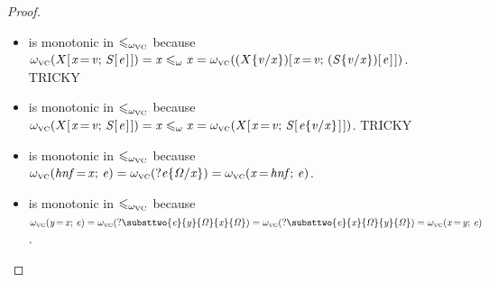 \begin{proof}
\begin{itemize}
\item {} is monotonic in $\leqomegavc$ \hfill\break
because $\omegavc(\ensuremath{X [\mskip1.5mu \Varid{x}\hspace{-0.14em}=\hspace{-0.14em}\Varid{v};\,\Conid{S} [\mskip1.5mu \Varid{e}\mskip1.5mu]\mskip1.5mu]}) = \ensuremath{\Varid{x}} \leqomega \ensuremath{\Varid{x}} = \omegavc(\ensuremath{(\subst{X}{\Varid{x}}{\Varid{v}}) [\mskip1.5mu \Varid{x}\hspace{-0.14em}=\hspace{-0.14em}\Varid{v};\,(\subst{\Conid{S}}{\Varid{x}}{\Varid{v}}) [\mskip1.5mu \Varid{e}\mskip1.5mu]\mskip1.5mu]})$. {\color{red} TRICKY}

\item {} is monotonic in $\leqomegavc$ \hfill\break
because $\omegavc(\ensuremath{X [\mskip1.5mu \Varid{x}\hspace{-0.14em}=\hspace{-0.14em}\Varid{v};\,\Conid{S} [\mskip1.5mu \Varid{e}\mskip1.5mu]\mskip1.5mu]}) = \ensuremath{\Varid{x}} \leqomega \ensuremath{\Varid{x}} = \omegavc(\ensuremath{X [\mskip1.5mu \Varid{x}\hspace{-0.14em}=\hspace{-0.14em}\Varid{v};\,\Conid{S} [\mskip1.5mu \subst{\Varid{e}}{\Varid{x}}{\Varid{v}}\mskip1.5mu]\mskip1.5mu]})$. {\color{red} TRICKY}

\item {} is monotonic in $\leqomegavc$
because $\omegavc(\ensuremath{\mathit{hnf}\hspace{-0.14em}=\hspace{-0.14em}\Varid{x};\,\Varid{e}}) = \omegavc(?\ensuremath{\subst{\Varid{e}}{\Varid{x}}{\mathit{\Omega}}}) = \omegavc(\ensuremath{\Varid{x}\hspace{-0.14em}=\hspace{-0.14em}\mathit{hnf};\,\Varid{e}})$.

\item {} is monotonic in $\leqomegavc$ \hfill\break
because $\omegavc(\ensuremath{\Varid{y}\hspace{-0.14em}=\hspace{-0.14em}\Varid{x};\,\Varid{e}}) = \omegavc({?}\ensuremath{\substtwo{\Varid{e}}{\Varid{y}}{\mathit{\Omega}}{\Varid{x}}{\mathit{\Omega}}}) = \omegavc({?}\ensuremath{\substtwo{\Varid{e}}{\Varid{x}}{\mathit{\Omega}}{\Varid{y}}{\mathit{\Omega}}}) = \omegavc(\ensuremath{\Varid{x}\hspace{-0.14em}=\hspace{-0.14em}\Varid{y};\,\Varid{e}})$.


\end{itemize}
\end{proof}
